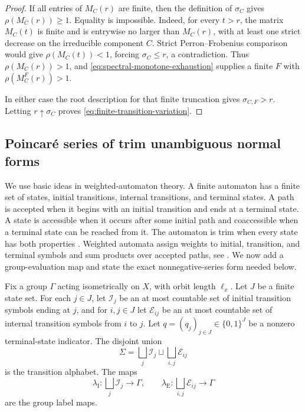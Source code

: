 \documentclass[11pt]{article}
\theoremstyle{definition}
\begin{document}
\begin{proof}
If all entries of $M_C(r)$ are finite, then the definition of $\sigma_C$ gives
$\rho(M_C(r))\ge1$.  Equality is impossible.  Indeed, for every $t>r$, the matrix
$M_C(t)$ is finite and is entrywise no larger than $M_C(r)$, with at least one strict decrease
on the irreducible component $C$.  Strict Perron--Frobenius comparison would give
$\rho(M_C(t))<1$, forcing $\sigma_C\le r$, a contradiction.  Thus
$\rho(M_C(r))>1$, and \eqref{eq:spectral-monotone-exhaustion} supplies a finite $F$ with
$\rho(M_C^F(r))>1$.

In either case the root description for that finite truncation gives
$\sigma_{C,F}>r$.  Letting $r\uparrow\sigma_C$ proves
\eqref{eq:finite-transition-variation}.
\end{proof}

\subsection{Poincar\'e series of trim unambiguous normal forms}
We use basic ideas in weighted-automaton theory.  A finite automaton has a finite set of states,
initial transitions, internal transitions, and terminal states. A path is accepted when it
begins with an initial transition and ends at a terminal state.  A state is accessible when it
occurs after some initial path and coaccessible when a terminal state can be reached from it.
The automaton is trim when every state has both properties
\cite[Definition~1.3.9]{BertheRigo2016}.  Weighted automata assign weights to initial,
transition, and terminal symbols and sum products over accepted paths, see
\cite[Section~2]{Mohri2009}.  We now add a group-evaluation map and state the exact
nonnegative-series form needed below.

Fix a group $\Gamma$ acting isometrically on $X$, with orbit length $\ell_x$.  Let $J$ be a
finite state set.  For each $j\in J$, let $\mathcal I_j$ be an at most countable set of
initial transition symbols ending at $j$, and for $i,j\in J$ let $\mathcal E_{ij}$ be an at
most countable set of internal transition symbols from $i$ to $j$.  Let
$q=(q_j)_{j\in J}\in\{0,1\}^J$ be a nonzero terminal-state indicator.  The disjoint union
\[
 \Sigma=\bigsqcup_j\mathcal I_j\sqcup
 \bigsqcup_{i,j}\mathcal E_{ij}
\]
is the transition alphabet.  The maps
\[
 \lambda_{\mathrm I}:\bigsqcup_j\mathcal I_j\to\Gamma,
 \qquad
 \lambda_{\mathrm E}:\bigsqcup_{i,j}\mathcal E_{ij}\to\Gamma
\]
are the group label maps.
\end{document}
